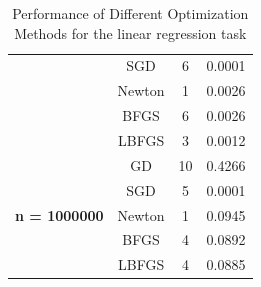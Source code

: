 \documentclass[9pt]{IEEEtran}
\begin{document}
\begin{table}[ht]
\begin{tabular}{|c|c|c|c|}
                                         & SGD   & 6     & 0.0001 \\
                                         & Newton& 1     & 0.0026 \\
                                         & BFGS  & 6     & 0.0026 \\
                                         & LBFGS & 3     & 0.0012 \\
        \hline
        \multirow{5}{*}{\textbf{n = 1000000}} & GD    & 10    & 0.4266 \\
                                         & SGD   & 5     & 0.0001 \\
                                         & Newton& 1     & 0.0945 \\
                                         & BFGS  & 4     & 0.0892 \\
                                         & LBFGS & 4     & 0.0885 \\
        \hline
        \end{tabular}
        \vspace{3pt}
        \caption{Performance of Different Optimization Methods for the linear regression task}
        \label{tab:performance}
        \end{table}
      


        
\end{document}
